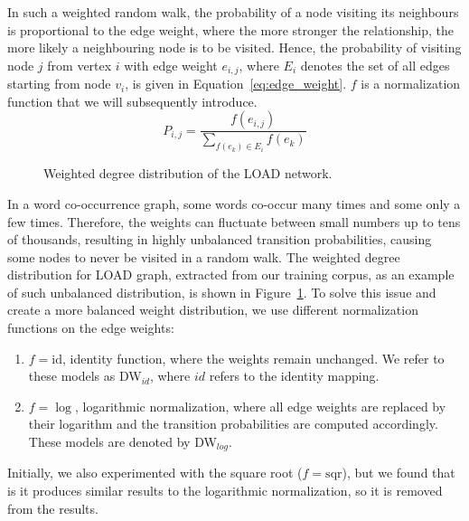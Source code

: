 In such a weighted random walk, the probability of a node visiting its neighbours is proportional to the edge weight, where the more stronger the relationship, the more likely a neighbouring node is to be visited. Hence, the probability of visiting node $j$ from vertex $i$ with edge weight $e_{i,j}$, where $ E_{ i }$ denotes the set of all edges starting from node $v_{i}$, is given in Equation~\ref{eq:edge_weight}. $f$ is a normalization function that we will subsequently introduce.
\begin{equation}
P_{i,j}=\frac{f(e_{i,j})}{\sum _{ f(e_ k )\in E_{ i } }^{  }{ f(e_k) } }
\label{eq:edge_weight}
\end{equation}


\begin{figure}
\centering 
\resizebox{0.6\textwidth}{0.6\textwidth}{      

}
\caption{Weighted degree distribution of the LOAD network.}
\label{fig:degrees}
\end{figure}
\noindent
In a word co-occurrence graph, some words co-occur many times and some only a few times. Therefore, the weights can fluctuate between small numbers up to tens of thousands, resulting in highly unbalanced transition probabilities, causing some nodes to never be visited in a random walk. The weighted degree distribution for LOAD graph, extracted from our training corpus, as an example of such unbalanced distribution, is shown in Figure~\ref{fig:degrees}. To solve this issue and create a more balanced weight distribution, we use different normalization functions on the edge weights:
\noindent
\begin{enumerate}
\item  $f=\mathrm{id}$, identity function, where the weights remain unchanged. We refer to these models as DW$_{id}$, where $id$ refers to the identity mapping.
\item  $f=\log$, logarithmic normalization, where all edge weights are replaced by their logarithm and the transition probabilities are computed accordingly. These models are denoted by DW$_{log}$.
\end{enumerate}
Initially, we also experimented with the square root ($f=\mathrm{sqr}$), but we found that is it produces similar results to the logarithmic normalization, so it is removed from the results.\\

